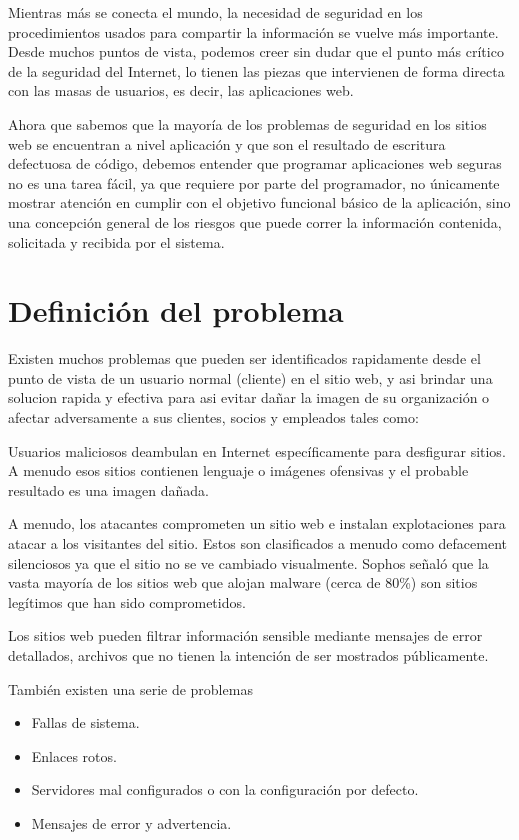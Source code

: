 \documentclass[letter,twoside,11pt]{article}
\begin{document}
Mientras más se conecta el mundo, la necesidad de seguridad en los
procedimientos usados para compartir la información se vuelve más importante.
Desde muchos puntos de vista, podemos creer sin dudar que el punto más crítico
de la seguridad del Internet, lo tienen las piezas que intervienen de forma
directa con las masas de usuarios, es decir, las aplicaciones web.

Ahora que sabemos que la mayoría de los problemas de seguridad en los sitios web
se encuentran a nivel aplicación y que son el resultado de escritura defectuosa
de código, debemos entender que programar aplicaciones web seguras no es una
tarea fácil, ya que requiere por parte del programador, no únicamente mostrar
atención en cumplir con el objetivo funcional básico de la aplicación, sino una
concepción general de los riesgos que puede correr la información contenida,
solicitada y recibida por el sistema.

\section{Definición del problema}
Existen muchos problemas que pueden ser identificados rapidamente desde el punto
de vista de un usuario normal (cliente) en el sitio web, y asi brindar una
solucion rapida y efectiva para asi evitar dañar la imagen de su organización o
afectar adversamente a sus clientes, socios y empleados tales como:

\begin{description}
    \item [Defacement de sitios web] Usuarios maliciosos deambulan en Internet
        específicamente para desfigurar sitios. A menudo esos sitios contienen
        lenguaje o imágenes ofensivas y el probable resultado es una imagen
        dañada.
    \item [Explotaciones web] A menudo, los atacantes comprometen un sitio web e
        instalan explotaciones para atacar a los visitantes del sitio. Estos son
        clasificados a menudo como defacement silenciosos ya que el sitio no se
        ve cambiado visualmente. Sophos señaló que la vasta mayoría de los
        sitios web que alojan malware (cerca de 80\%) son sitios legítimos que
        han sido comprometidos.
    \item [Fugas de información sensible] Los sitios web pueden filtrar
        información sensible mediante mensajes de error detallados, archivos que
        no tienen la intención de ser mostrados públicamente.
    \item También existen una serie de problemas
        \begin{itemize}
        \item Fallas de sistema.
        \item Enlaces rotos.
        \item Servidores mal configurados o con la configuración por defecto.
        \item Mensajes de error y advertencia.
        \end{itemize}
\end{description}
\end{document}
